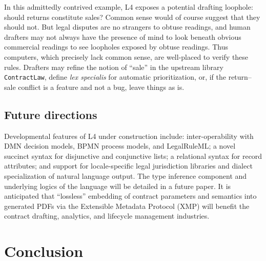 \documentclass{IOS-Book-Article}
\begin{document}
\noindent In this admittedly contrived example, L4 exposes a potential drafting loophole: should returns constitute sales? Common sense would of course suggest that they should not. But legal disputes are no strangers to obtuse readings, and human drafters may not always have the presence of mind to look beneath obvious commercial readings to see loopholes exposed by obtuse readings. Thus computers, which precisely lack common sense, are well-placed to verify these rules. Drafters may refine the notion of ``sale'' in the upstream library \texttt{ContractLaw}, define \textit{lex specialis} for automatic prioritization, or, if the return--sale conflict is a feature and not a bug, leave things as is.

\subsection{Future directions}

Developmental features of L4 under construction include: inter-operability with DMN decision models, BPMN process models, and LegalRuleML\cite{athan_legalruleml_2013}; a novel succinct syntax for disjunctive and conjunctive lists; a relational syntax for record attributes; and support for locale-specific legal jurisdiction libraries and dialect specialization of natural language output. The type inference component and underlying logics of the language will be detailed in a future paper. It is anticipated that ``lossless'' embedding of contract parameters and semantics into generated PDFs via the Extensible Metadata Protocol (XMP) will benefit the contract drafting, analytics, and lifecycle management industries.

\section{Conclusion}



\end{document}

